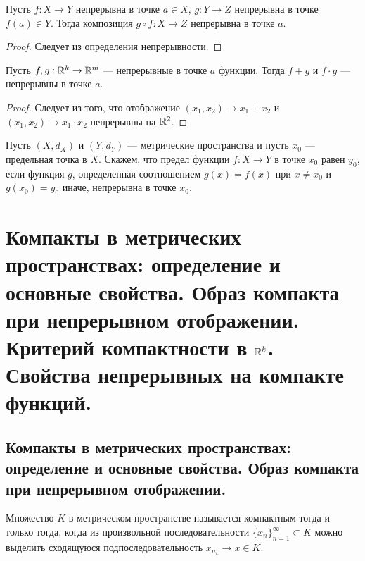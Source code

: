 \documentclass[a4paper]{article}
\theoremstyle{named}
\begin{document}
    \begin{proposal*}
        Пусть $f: X \to Y$ непрерывна в точке $a \in X$, $g: Y \to Z$ непрерывна в точке $f(a) \in Y$. Тогда композиция $g \circ f: X \to Z$ непрерывна в точке $a$.
    \end{proposal*}

    \begin{proof}
        Следует из определения непрерывности.
    \end{proof}

    \begin{consequence*}
        Пусть $f, g: \mathbb{R}^k \to \mathbb{R}^m$ --- непрерывные в точке $a$ функции. Тогда $f + g$ и $f \cdot g$ --- непрерывны в точке $a$.
    \end{consequence*}

    \begin{proof}
        Следует из того, что отображение $(x_1, x_2) \to x_1 + x_2$ и $(x_1, x_2) \to x_1 \cdot x_2$ непрерывны на $\mathbb{R}^2$.
    \end{proof}

    \begin{definition*}
        Пусть $(X, d_X)$ и $(Y, d_Y)$ --- метрические пространства и пусть $x_0$ --- предельная точка в $X$. Скажем, что предел функции $f: X \to Y$ в точке $x_0$ равен $y_0$, если функция $g$, определенная соотношением $g(x) = f(x)$ при $x \neq x_0$ и $g(x_0) = y_0$ иначе, непрерывна в точке $x_0$.
    \end{definition*}
        
    \section{Компакты в метрических пространствах: определение и основные свойства. Образ компакта при непрерывном отображении. Критерий компактности в $\mathbb{R}^k$. Свойства непрерывных на компакте функций.}

    \subsection{Компакты в метрических пространствах: определение и основные свойства. Образ компакта при непрерывном отображении.}

    \begin{definition*}
        Множество $K$ в метрическом пространстве называется компактным тогда и только тогда, когда из произвольной последовательности $\{x_n\}_{n = 1}^{\infty} \subset K$ можно выделить сходящуюся подпоследовательность $x_{n_k} \to x \in K$.
    \end{definition*}
\end{document}
